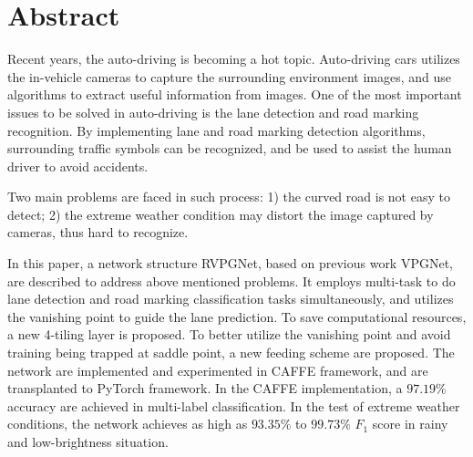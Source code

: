 \newpage
{}
\chapter*{\centering Abstract}
\begin{spacing}{1.5}
\setlength{\parskip}{0.3in}
\thispagestyle{addin}

Recent years, the auto-driving is becoming a hot topic. Auto-driving cars utilizes the in-vehicle cameras to capture the surrounding environment images, and use algorithms to extract useful information from images. One of the most important issues to be solved in auto-driving is the lane detection and road marking recognition. By implementing lane and road marking detection algorithms, surrounding traffic symbols can be recognized, and be used to assist the human driver to avoid accidents. 

Two main problems are faced in such process: 1) the curved road is not easy to detect; 2) the extreme weather condition may distort the image captured by cameras, thus hard to recognize.

In this paper, a network structure RVPGNet, based on previous work VPGNet, are described to address above mentioned problems. It employs  multi-task to do lane detection and road marking classification tasks simultaneously, and utilizes the vanishing point to guide the lane prediction. To save computational resources, a new 4-tiling layer is proposed. To better utilize the vanishing point and avoid training being trapped at saddle point, a new feeding scheme are proposed. The network are implemented and experimented in CAFFE framework, and are transplanted to PyTorch framework. In the CAFFE implementation, a $97.19\%$ accuracy are achieved in multi-label classification. In the test of extreme weather conditions, the network achieves as high as $93.35\%$ to $99.73\%$ $F_1$ score in rainy and low-brightness situation.


\end{spacing}
\newpage
